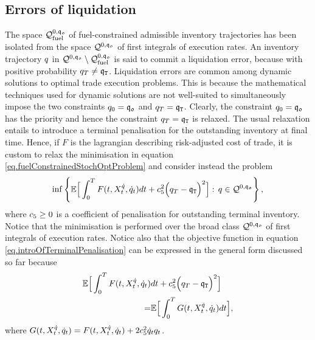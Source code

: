\documentclass[10pt,a4paper]{article}
\begin{document}
	
	\subsection{Errors of liquidation}\label{sec.errorsOfLiquidation}
	The space $\mathcal{Q}_{\text{fuel}}^{0,\mathfrak{q_0}}$ of fuel-constrained admissible inventory trajectories has been isolated from the space $\mathcal{Q}^{0,\mathfrak{q_0}}$ of first integrals of execution rates. An inventory trajectory $q$ in $\mathcal{Q}^{0,\mathfrak{q_0}}\setminus \mathcal{Q}_{\text{fuel}}^{0,\mathfrak{q_0}}$ is said to commit a liquidation error, because with positive probability $q_T \neq \mathfrak{q}_{\mathtt{T} }$. Liquidation errors are common among dynamic solutions to optimal trade execution problems. This is because the mathematical techniques used for dynamic solutions are not well-suited to simultaneously impose the two constraints $q_0 = \mathfrak{q_0}$ and $q_T = \mathfrak{q}_{\mathtt{T} }$. Clearly, the constraint $q_0 = \mathfrak{q_0}$ has the priority and hence the constraint $q_T = \mathfrak{q}_{\mathtt{T} }$ is relaxed. The usual relaxation entails to introduce a terminal penalisation for the outstanding inventory at final time. Hence, if $F$ is the lagrangian describing risk-adjusted cost of trade, it is custom to relax the minimisation in equation \eqref{eq.fuelConstrainedStochOptProblem} and consider instead the problem
	\begin{equation}
	\label{eq.introOfTerminalPenalisation}
	\inf\left\lbrace
	\mathbb{{E}} \Big[
	\int_{0}^{T} F(t,X_t^{\dot{q}},\dot{q}_{t}) dt + c_{5}^{2} \Big(q_T - \mathfrak{q}_{\mathtt{T} }\Big)^{2}
	\Big] : \, 
	q \in \mathcal{Q}^{0,\mathfrak{q_0}}
	\right\rbrace,
	\end{equation}
	where $c_{5}\geq 0$ is a coefficient of penalisation for outstanding terminal inventory. Notice that the minimisation is performed over the broad class $\mathcal{Q}^{0,\mathfrak{q_0}}$ of first integrals of execution rates. Notice also that the objective function in equation \eqref{eq.introOfTerminalPenalisation} can be expressed in the general form discussed so far because 
	\begin{equation*}
	\begin{split}
	\mathbb{{E}} \Big[
	\int_{0}^{T} F(t,X_t^{\dot{q}},\dot{q}_{t}) &dt + c_{5}^{2} \Big(q_T - \mathfrak{q}_{\mathtt{T} }\Big)^{2}
	\Big] \\
	=& \mathbb{{E}} \Big[  \int_{0}^{T} G(t,X_t^{\dot{q}},\dot{q}_{t}) dt \Big],
	\end{split}
	\end{equation*}
	where $ G(t,X_t^{\dot{q}},\dot{q}_{t}) =  F(t,X_t^{\dot{q}},\dot{q}_{t}) + 2c_{5}^{2} \dot{q}_{t} q_t$. 
	
\end{document}
